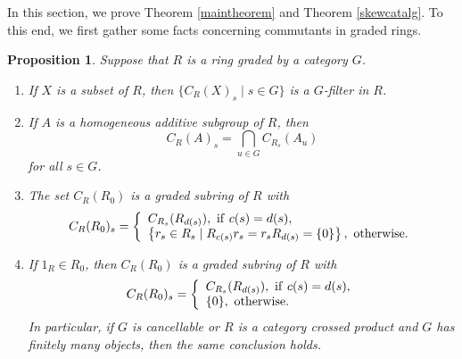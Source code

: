 \documentclass[11pt,leqno]{amsart}
\theoremstyle{plain}
\newtheorem{prop}{Proposition}
\theoremstyle{definition}
\begin{document}
In this section, we prove Theorem \ref{maintheorem} and
Theorem \ref{skewcatalg}.
To this end, we first gather some facts concerning
commutants in graded rings.

\begin{prop}\label{gradedcommutant}
Suppose that $R$ is a ring graded by a category $G$.
\begin{enumerate}[{\rm (a)}]
\item If $X$ is a subset of $R$, then
$\{ C_R(X)_s \mid s \in G \}$
is a $G$-filter in $R$.

\item If $A$ is a homogeneous additive subgroup of $R$,
then $$C_R(A)_s  = \bigcap_{u \in G} C_{R_s}(A_u)$$
for all $s \in G$.

\item The set $C_R(R_0)$ is a
graded subring of $R$ with
$$C_R(R_0)_s =
\left\{
\begin{array}{l}
C_{R_s}(R_{d(s)}), \ {\rm if} \ c(s)=d(s), \\
\left\{ r_s \in R_s \mid R_{c(s)}r_s = r_s R_{d(s)}
= \{ 0 \} \right\}, \ {\rm otherwise.} \\
\end{array}
\right.$$

\item If $1_R \in R_0$, then $C_R(R_0)$ is a
graded subring of $R$ with
$$C_R(R_0)_s =
\left\{
\begin{array}{l}
C_{R_s}(R_{d(s)}), \ {\rm if} \ c(s)=d(s), \\
\{ 0 \}, \ {\rm otherwise.} \\
\end{array}
\right.$$ In particular, if $G$ is cancellable
or $R$ is a category crossed product and $G$ has finitely many objects, then the same
conclusion holds.
\end{enumerate}
\end{prop}
\end{document}
